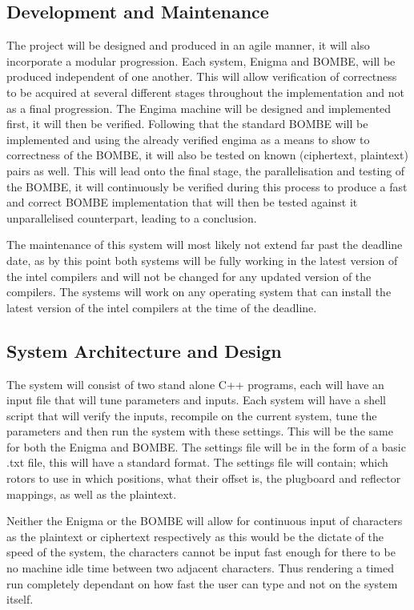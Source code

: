 \documentclass[12pt,a4paper]{article}
\begin{document}
\subsection{Development and Maintenance}

The project will be designed and produced in an agile manner, it will also incorporate a modular progression. Each system, Enigma and BOMBE, will be produced independent of one another. This will allow verification of correctness to be acquired at several different stages throughout the implementation and not as a final progression. The Engima machine will be designed and implemented first, it will then be verified. Following that the standard BOMBE will be implemented and using the already verified engima as a means to show to correctness of the BOMBE, it will also be tested on known (ciphertext, plaintext) pairs as well. This will lead onto the final stage, the parallelisation and testing of the BOMBE, it will continuously be verified during this process to produce a fast and correct BOMBE implementation that will then be tested against it unparallelised counterpart, leading to a conclusion.

The maintenance of this system will most likely not extend far past the deadline date, as by this point both systems will be fully working in the latest version of the intel compilers and will not be changed for any updated version of the compilers. The systems will work on any operating system that can install the latest version of the intel compilers at the time of the deadline.

\subsection{System Architecture and Design}

The system will consist of two stand alone C++ programs, each will have an input file that will tune parameters and inputs. Each system will have a shell script that will verify the inputs, recompile on the current system, tune the parameters and then run the system with these settings. This will be the same for both the Enigma and BOMBE. The settings file will be in the form of a basic .txt file, this will have a standard format. The settings file will contain; which rotors to use in which positions, what their offset is, the plugboard and reflector mappings, as well as the plaintext. 

Neither the Enigma or the BOMBE will allow for continuous input of characters as the plaintext or ciphertext respectively as this would be the dictate of the speed of the system, the characters cannot be input fast enough for there to be no machine idle time between two adjacent characters. Thus rendering a timed run completely dependant on how fast the user can type and not on the system itself.
\end{document}
